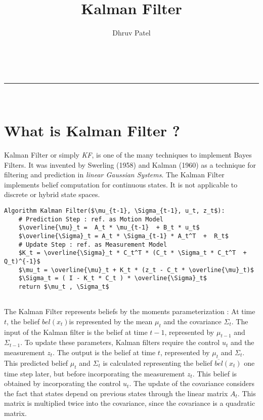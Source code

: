 \documentclass[a4paper,12pt]{extarticle}
\makeatletter
\newcommand{\linia}{\rule{\linewidth}{0.5pt}}
\theoremstyle{mytheor}
\renewcommand{\maketitle}{
\begin{center}
\vspace{2ex}
{\huge \textsc{\@title}}
\vspace{1ex}
\\
\linia\\
\@author \hfill \@date
\vspace{4ex}
\end{center}
}
\makeatother
\begin{document}
\title{ Kalman Filter }

\author{ Dhruv Patel }

\maketitle

\section*{ What is Kalman Filter ? }


Kalman Filter or simply \emph{KF}, is one of the many techniques to implement Bayes Filters. It was invented by Swerling (1958) and Kalman (1960) as a technique for filtering and prediction in \emph{linear Gaussian Systems}. The Kalman Filter implements belief computation for continuous states. It is not applicable to discrete or hybrid state spaces.


\begin{lstlisting}
Algorithm Kalman Filter($\mu_{t-1}, \Sigma_{t-1}, u_t, z_t$):
	# Prediction Step : ref. as Motion Model
	$\overline{\mu}_t =  A_t * \mu_{t-1}  + B_t * u_t$
	$\overline{\Sigma}_t = A_t * \Sigma_{t-1} * A_t^T  +  R_t$
	# Update Step : ref. as Measurement Model
	$K_t = \overline{\Sigma}_t * C_t^T * (C_t * \Sigma_t * C_t^T  +  Q_t)^{-1}$
	$\mu_t = \overline{\mu}_t + K_t * (z_t - C_t * \overline{\mu}_t)$
	$\Sigma_t = ( I - K_t * C_t ) * \overline{\Sigma}_t$
	return $\mu_t , \Sigma_t$
	
\end{lstlisting}


The Kalman Filter represents beliefs by the moments parameterization : At time $t$, the belief $bel(x_t)$is represented by the mean $\mu_t$ and the covariance $\Sigma_t$. The input of the Kalman filter is the belief at time $t-1$, represented by $\mu_{t-1}$ and $\Sigma_{t-1}$. To update these parameters, Kalman filters require the control $u_t$ and the measurement $z_t$. The output is the belief at time $t$, represented by $\mu_t$ and $\Sigma_t$. This predicted belief $\mu_t$ and $\Sigma_t$ is calculated representing the belief $\overline{bel}(x_t)$ one time step later, but before incorporating the measurement $z_t$. This belief is obtained by incorporating the control $u_t$. The update of the covariance considers the fact that states depend on previous states through the linear matrix $A_t$. This matrix is multiplied twice into the covariance, since the covariance is a quadratic matrix.
\end{document}
